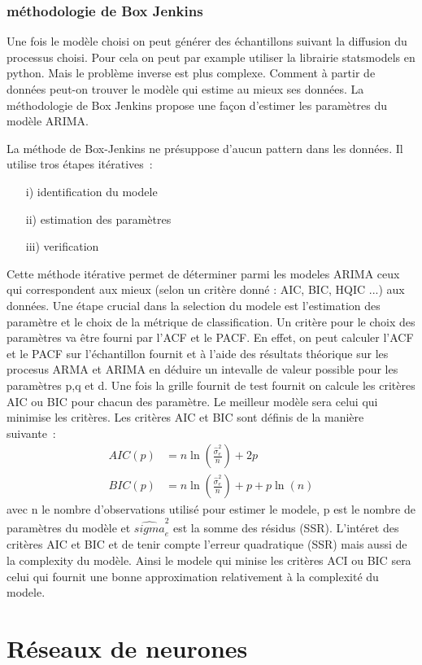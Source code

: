 \documentclass[11pt]{scrartcl} %
\begin{document}
\subsubsection{méthodologie de Box Jenkins}
Une fois le modèle choisi on peut générer des échantillons suivant la diffusion du processus choisi. Pour cela on peut par example utiliser la librairie statsmodels en python. Mais le problème inverse est plus complexe. Comment à partir de données peut-on trouver le modèle qui estime au mieux ses données. La méthodologie de Box Jenkins propose une façon d'estimer les paramètres du modèle ARIMA.


La méthode de Box-Jenkins \cite{BoxJenkins} ne présuppose d'aucun pattern dans les données. Il utilise tros étapes itératives~:
\begin{itemize}
\item[i)] identification du modele
\item[ii)] estimation des paramètres
\item[iii)] verification
\end{itemize}
Cette méthode itérative permet de déterminer parmi les modeles ARIMA ceux qui correspondent aux mieux (selon un critère donné : AIC, BIC, HQIC ...) aux données.
Une étape crucial dans la selection du modele est l'estimation des paramètre et le choix de la métrique de classification. Un critère pour le choix des paramètres va être fourni par l'ACF et le PACF. En effet, on peut calculer l'ACF et le PACF sur l'échantillon fournit et à l'aide des résultats théorique sur les procesus ARMA et ARIMA en déduire un intevalle de valeur possible pour les paramètres p,q et d. Une fois la grille fournit de test fournit on calcule les critères AIC ou BIC pour chacun des paramètre. Le meilleur modèle sera celui qui minimise les critères. Les critères AIC et BIC sont définis de la manière suivante~:
\begin{align*}
AIC(p)&=n\ln\left({\frac{\hat{\sigma}_e^2}{n}}\right)+2p\\
BIC(p)&=n\ln\left({\frac{\hat{\sigma}_e^2}{n}}\right)+p+p\ln(n)
\end{align*}
avec n le nombre d'observations utilisé pour estimer le modele, p est le nombre de paramètres du modèle et $\hat{sigma}_e^2$ est la somme des résidus (SSR). L'intéret des critères AIC et BIC et de tenir compte l'erreur quadratique (SSR) mais aussi de la complexity du modèle. Ainsi le modele qui minise les critères ACI ou BIC sera celui qui fournit une bonne approximation relativement à la complexité du modele.
\section{Réseaux de neurones}
\end{document}
